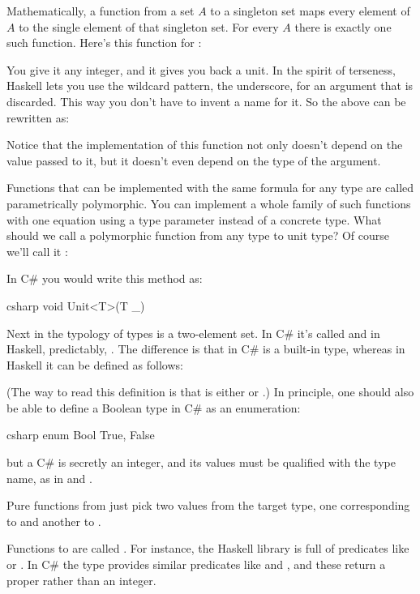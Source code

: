Mathematically, a function from a set $A$ to a singleton set maps every
element of $A$ to the single element of that singleton set. For every $A$
there is exactly one such function. Here's this function for
:

You give it any integer, and it gives you back a unit. In the spirit of
terseness, Haskell lets you use the wildcard pattern, the underscore,
for an argument that is discarded. This way you don't have to invent a
name for it. So the above can be rewritten as:

Notice that the implementation of this function not only doesn't depend
on the value passed to it, but it doesn't even depend on the type of the
argument.

Functions that can be implemented with the same formula for any type are
called parametrically polymorphic. You can implement a whole family of
such functions with one equation using a type parameter instead of a
concrete type. What should we call a polymorphic function from any type
to unit type? Of course we'll call it :

In C\# you would write this method as:

\begin{snip}{csharp}
void Unit<T>(T _) { }
\end{snip}
Next in the typology of types is a two-element set. In C\# it's called
 and in Haskell, predictably, . The difference
is that in C\#  is a built-in type, whereas in Haskell it
can be defined as follows:

(The way to read this definition is that  is either
 or .) In principle, one should also be able
to define a Boolean type in C\# as an enumeration:

\begin{snip}{csharp}
enum Bool {
    True,
    False
}
\end{snip}
but a C\#  is secretly an integer, and its values must be
qualified with the type name, as in  and
.

Pure functions from  just pick two values from the target
type, one corresponding to  and another to .

Functions to  are called . For instance,
the Haskell library  is full of predicates like
 or . In C\# the  type
provides similar predicates like  and
, and these return a proper  rather than
an integer.


